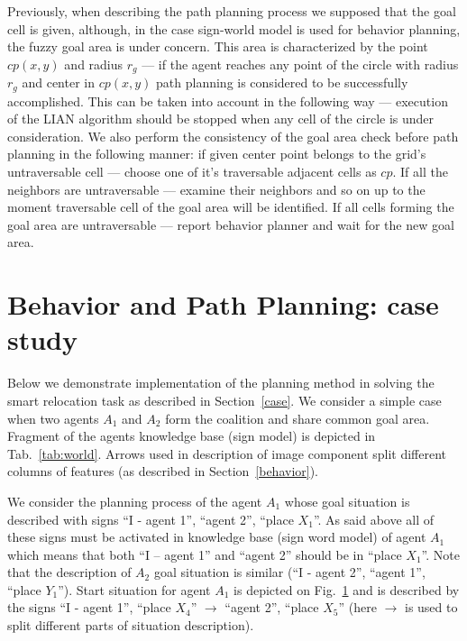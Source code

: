 \documentclass[runningheads,a4paper]{llncs}
\begin{document}
Previously, when describing the path planning process we supposed that the goal cell is given, although, in the case sign-world model is used for behavior planning, the fuzzy goal area is under concern. This area is characterized by the point $cp(x, y)$ and radius $r_g$ --- if the agent reaches any point of the circle with radius $r_g$ and center in $cp(x, y)$ path planning is considered to be successfully accomplished. This can be taken into account in the following way --- execution of the LIAN algorithm should be stopped when any cell of the circle is under consideration. We also perform the consistency of the goal area check before path planning in the following manner: if given center point belongs to the grid's untraversable cell --- choose one of it's traversable adjacent cells as $cp$. If all the neighbors are untraversable --- examine their neighbors and so on up to the moment traversable cell of the goal area will be identified. If all cells forming the goal area are untraversable --- report  behavior planner and wait for the new goal area. 

\section{Behavior and Path Planning: case study}\label{example}

Below we demonstrate implementation of the planning method in solving the smart relocation task as described in Section~\ref{case}. We consider a simple case when two agents $A_1$ and $A_2$ form the coalition and share common goal area. Fragment of the agents knowledge base (sign model) is depicted in Tab.~\ref{tab:world}. Arrows used in description of image component split different columns of features (as described in Section~\ref{behavior}).

We consider the planning process of the agent $A_1$ whose goal situation is described with signs ``I - agent 1'', ``agent 2'', ``place $X_1$''. As said above all of these signs must be activated in knowledge base (sign word model) of agent $A_1$ which means that both ``I – agent 1'' and ``agent 2'' should be in ``place $X_1$''. Note that the description of $A_2$ goal situation is similar (``I - agent 2'', ``agent 1'', ``place $Y_1$''). Start situation for agent $A_1$ is depicted on Fig.~\ref{example} and is described by the signs ``I - agent 1'', ``place $X_4$'' $\rightarrow$  ``agent 2'', ``place $X_5$'' (here $\rightarrow$ is used to split different parts of situation description).
\end{document}
